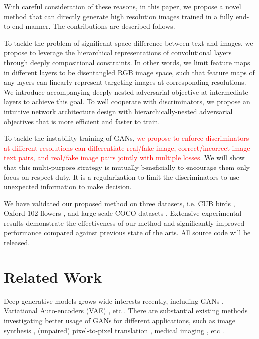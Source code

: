 \documentclass[10pt,twocolumn,letterpaper]{article}
\begin{document}
With careful consideration of these reasons, in this paper, we propose a novel method that can directly generate high resolution images trained in a fully end-to-end manner. The contributions are described follows.

To tackle the problem of significant space difference between text and images, we propose to leverage the hierarchical representations of convolutional layers through deeply compositional constraints. In other words, we limit feature maps in different layers to be disentangled RGB image space, such that feature maps of any layers can linearly represent targeting images at corresponding resolutions. We introduce accompanying deeply-nested adversarial objective at intermediate layers to achieve this goal.
To well cooperate with discriminators, we propose an intuitive network architecture design with hierarchically-nested adversarial objectives that is more efficient and faster to train.

To tackle the instability training of GANs, \textcolor{red}{we propose to enforce discriminators at different resolutions can differentiate real/fake image, correct/incorrect image-text pairs, and real/fake image pairs jointly with multiple losses.} We will show that this multi-purpose strategy is mutually beneficially to encourage them only focus on respect duty. It is a regularization to limit the discriminators to use unexpected information to make decision. 

We have validated our proposed method on three datasets, i.e. CUB birds \cite{}, Oxford-102 flowers \cite{}, and large-scale COCO datasets \cite{}. Extensive experimental results demonstrate the effectiveness of our method and significantly improved performance compared against previous state of the arts. All source code will be released.


\section{Related Work}
Deep generative models grows wide interests recently, including GANs \cite{goodfellow2014generative}, Variational Auto-encoders (VAE) \cite{kingma2013auto}, etc \cite{oord2016pixel}. 
There are substantial existing methods investigating better usage of GANs for different applications, such as image synthesis \cite{radford2015unsupervised, shrivastava2016learning}, (unpaired) pixel-to-pixel translation \cite{isola2016image,zhu2017unpaired},  medical imaging \cite{costa2017towards}, etc \cite{ledig2016photo,huang2016stacked}.
\end{document}
